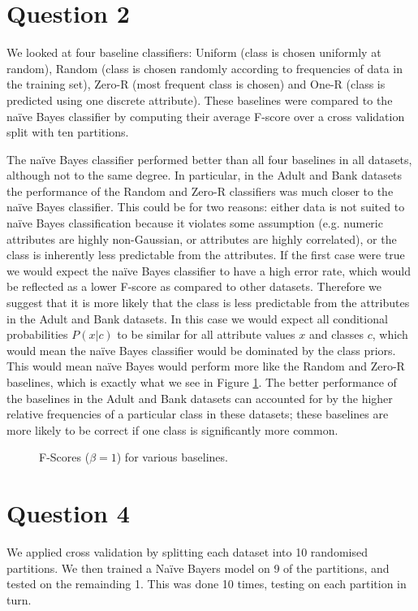 \documentclass[11pt]{article}
\begin{document}
    \pagebreak
    \section*{Question 2}
    We looked at four baseline classifiers: Uniform (class is chosen uniformly at random), Random (class is chosen randomly according to frequencies of data in the training set), Zero-R (most frequent class is chosen) and One-R (class is predicted using one discrete attribute). These baselines were compared to the na\"{i}ve Bayes classifier by computing their average F-score over a cross validation split with ten partitions. 

    The na\"{i}ve Bayes classifier performed better than all four baselines in all datasets, although not to the same degree. In particular, in the Adult and Bank datasets the performance of the Random and Zero-R classifiers was much closer to the na\"{i}ve Bayes classifier. This could be for two reasons: either data is not suited to na\"{i}ve Bayes classification because it violates some assumption (e.g. numeric attributes are highly non-Gaussian, or attributes are highly correlated), or the class is inherently less predictable from the attributes. If the first case were true we would expect the na\"{i}ve Bayes classifier to have a high error rate, which would be reflected as a lower F-score as compared to other datasets. Therefore we suggest that it is more likely that the class is less predictable from the attributes in the Adult and Bank datasets. In this case we would expect all conditional probabilities $P(x|c)$ to be similar for all attribute values $x$ and classes $c$, which would mean the na\"{i}ve Bayes classifier would be dominated by the class priors. This would mean na\"{i}ve Bayes would perform more like the Random and Zero-R baselines, which is exactly what we see in Figure \ref{fig:q2-baseline-fscores}. The better performance of the baselines in the Adult and Bank datasets can accounted for by the higher relative frequencies of a particular class in these datasets; these baselines are more likely to be correct if one class is significantly more common.


    \begin{figure}[H]
        \centering
        \def\svgwidth{\columnwidth}
        \fbox{\scalebox{0.5}{}}
        \caption{F-Scores ($\beta = 1$) for various baselines.}
        \label{fig:q2-baseline-fscores}
    \end{figure}

    \pagebreak
    \section*{Question 4}
    We applied cross validation by splitting each dataset into 10 randomised partitions. We then trained a Na\"{i}ve Bayers model on 9 of the partitions, and tested on the remainding 1. This was done 10 times, testing on each partition in turn.
\end{document}
